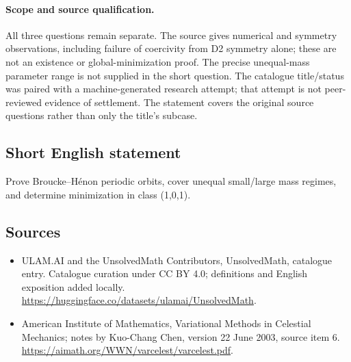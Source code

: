 \documentclass[11pt]{article}
\begin{document}
\paragraph{Scope and source qualification.}All three questions remain separate. The source gives numerical and symmetry observations, including failure of coercivity from D2 symmetry alone; these are not an existence or global-minimization proof. The precise unequal-mass parameter range is not supplied in the short question. The catalogue title/status was paired with a machine-generated research attempt; that attempt is not peer-reviewed evidence of settlement. The statement covers the original source questions rather than only the title’s subcase.
\subsection{Short English statement}
Prove Broucke–Hénon periodic orbits, cover unequal small/large mass regimes, and determine minimization in class (1,0,1).
\subsection{Sources}
\begin{itemize}
\item[\hypertarget{source:statement:1}{S1}] ULAM.AI and the UnsolvedMath Contributors, UnsolvedMath, catalogue entry. Catalogue curation under CC BY 4.0; definitions and English exposition added locally.
\url{https://huggingface.co/datasets/ulamai/UnsolvedMath}.
\item[\hypertarget{source:statement:2}{S2}] American Institute of Mathematics, Variational Methods in Celestial Mechanics; notes by Kuo-Chang Chen, version 22 June 2003, source item 6.
\url{https://aimath.org/WWN/varcelest/varcelest.pdf}.
\end{itemize}
\label{end:statement}
\end{document}

